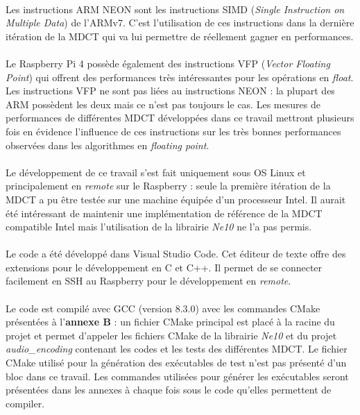 \documentclass{article}
\begin{document}
    \paragraph{}
    Les instructions ARM NEON sont les instructions SIMD (\emph{Single Instruction on Multiple Data}) de l'ARMv7. C'est l'utilisation de ces instructions dans la dernière itération de la MDCT qui va lui permettre de réellement gagner en performances.

    \paragraph{}
    Le Raspberry Pi 4 possède également des instructions VFP (\emph{Vector Floating Point}) qui offrent des performances très intéressantes pour les opérations en \emph{float}. Les instructions VFP ne sont pas liées au instructions NEON : la plupart des ARM possèdent les deux mais ce n'est pas toujours le cas. Les mesures de performances de différentes MDCT développées dans ce travail mettront plusieurs fois en évidence l'influence de ces instructions sur les très bonnes performances observées dans les algorithmes en \emph{floating point}.

    \paragraph{}
    Le développement de ce travail s'est fait uniquement sous OS Linux et principalement en \emph{remote} sur le Raspberry : seule la première itération de la MDCT a pu être testée sur une machine équipée d'un processeur Intel. Il aurait été intéressant de maintenir une implémentation de référence de la MDCT compatible Intel mais l'utilisation de la librairie \emph{Ne10} ne l'a pas permis.

    \paragraph{}
    Le code a été développé dans Visual Studio Code. Cet éditeur de texte offre des extensions pour le développement en C et C++. Il permet de se connecter facilement en SSH au Raspberry pour le développement en \emph{remote}.

    \paragraph{}
    Le code est compilé avec GCC (version 8.3.0) avec les commandes CMake présentées à l'\textbf{annexe B} : un fichier CMake principal est placé à la racine du projet et permet d'appeler les fichiers CMake de la librairie \emph{Ne10} et du projet \emph{audio\_encoding} contenant les codes et les tests des différentes MDCT. Le fichier CMake utilisé pour la génération des exécutables de test n'est pas présenté d'un bloc dans ce travail. Les commandes utilisées pour générer les exécutables seront présentées dans les annexes à chaque fois sous le code qu'elles permettent de compiler.
\end{document}
